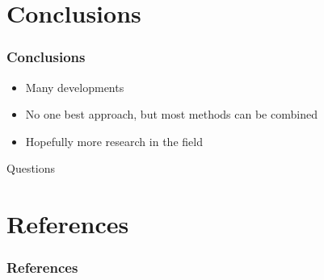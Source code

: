 \documentclass{beamer}
\begin{document}
	\section{Conclusions}
	
	\begin{frame}
		\frametitle{Conclusions}
		
		\begin{itemize}
			\item Many developments
			\item No one best approach, but most methods can be combined
			\item Hopefully more research in the field
		\end{itemize}
	\end{frame}
	
	\begin{frame}
		Questions
	\end{frame}
	
	\section{References}
	
	\begin{frame}
		\frametitle{References}
		\tiny
		
		
	\end{frame}
\end{document}

